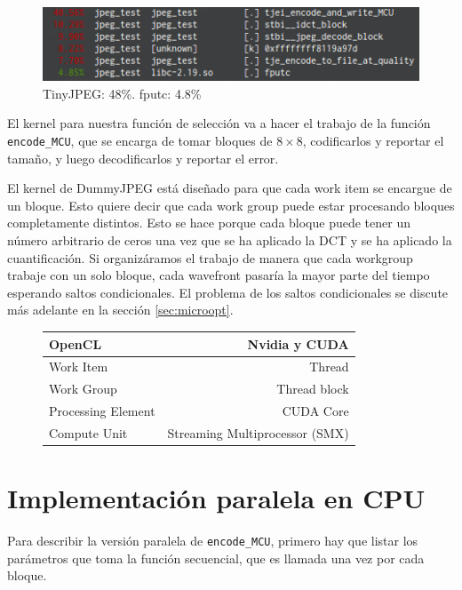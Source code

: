 \begin{figure}[ht]
    \includegraphics[width=4.5625in]{fputc}
    \caption{TinyJPEG: 48\%. fputc: 4.8\%}
\end{figure}

El kernel para nuestra función de selección va a hacer el trabajo de la función
\verb+encode_MCU+, que se encarga de tomar bloques de $8\times8$, codificarlos
y reportar el tamaño, y luego decodificarlos y reportar el error.

El kernel de DummyJPEG está diseñado para que cada work item se encargue de un
bloque. Esto quiere decir que cada work group puede estar procesando bloques
completamente distintos. Esto se hace porque cada bloque puede tener un número
arbitrario de ceros una vez que se ha aplicado la \gls{DCT} y se ha aplicado la
cuantificación. Si organizáramos el trabajo de manera que cada workgroup trabaje
con un solo bloque, cada wavefront pasaría la mayor parte del tiempo esperando saltos
condicionales. El problema de los saltos condicionales se discute más adelante
en la sección \ref{sec:microopt}.

\begin {figure}
    \begin{tabular}{ | l | r | }
    \hline
    OpenCL             & Nvidia y CUDA \\
    \hline
    Work Item          & Thread \\
    Work Group         & Thread block \\
    Processing Element & CUDA Core \\
    Compute Unit       & Streaming Multiprocessor (SMX) \\
    \hline
    \end{tabular}
    \label{fig:equiv}
\end{figure}

\section{Implementación paralela en CPU}

Para describir la versión paralela de \verb+encode_MCU+, primero hay que listar
los parámetros que toma la función secuencial, que es llamada una vez por cada
bloque.

